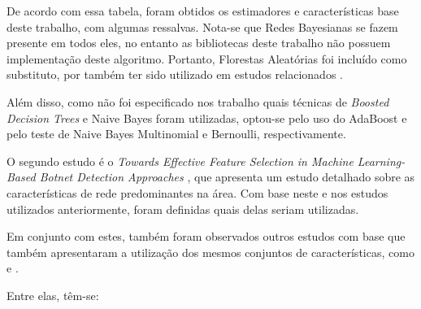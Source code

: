 De acordo com essa tabela, foram obtidos os estimadores e características base deste trabalho, com algumas ressalvas. Nota-se que Redes Bayesianas se fazem presente em todos eles, no entanto as bibliotecas deste trabalho não possuem implementação deste algoritmo. Portanto, Florestas Aleatórias foi incluído como substituto, por também ter sido utilizado em estudos relacionados \cite{rna2}. 

Além disso, como não foi especificado nos trabalho quais técnicas de \textit{Boosted Decision Trees} e Naive Bayes foram utilizadas, optou-se pelo uso do AdaBoost e pelo teste de Naive Bayes Multinomial e Bernoulli, respectivamente.

O segundo estudo é o \textit{Towards Effective Feature Selection in Machine Learning-Based Botnet Detection Approaches} \cite{beigi2014towards}, que apresenta um estudo detalhado sobre as características de rede predominantes na área. Com base neste e nos estudos utilizados anteriormente, foram definidas quais delas seriam utilizadas. 

Em conjunto com estes, também foram observados outros estudos com base que também apresentaram a utilização dos mesmos conjuntos de características, como \cite{featureselection} e \cite{iscx1}.

Entre elas, têm-se:

